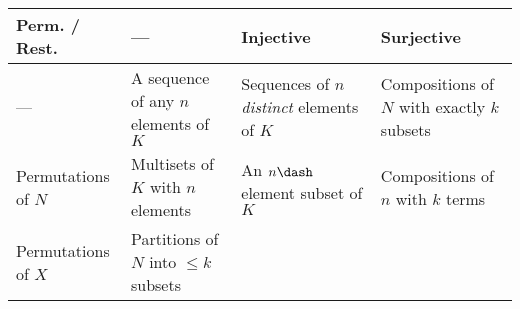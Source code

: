 \begin{longtable}[]{@{}llll@{}}
\toprule
\begin{minipage}[b]{0.18\columnwidth}\raggedright
Perm. / Rest.\strut
\end{minipage} & \begin{minipage}[b]{0.27\columnwidth}\raggedright
---\strut
\end{minipage} & \begin{minipage}[b]{0.27\columnwidth}\raggedright
Injective\strut
\end{minipage} & \begin{minipage}[b]{0.18\columnwidth}\raggedright
Surjective\strut
\end{minipage}\tabularnewline
\midrule
\endhead
\begin{minipage}[t]{0.18\columnwidth}\raggedright
---\strut
\end{minipage} & \begin{minipage}[t]{0.27\columnwidth}\raggedright
A sequence of any \(n\) elements of \(K\)\strut
\end{minipage} & \begin{minipage}[t]{0.27\columnwidth}\raggedright
Sequences of \(n\) \emph{distinct} elements of \(K\)\strut
\end{minipage} & \begin{minipage}[t]{0.18\columnwidth}\raggedright
Compositions of \(N\) with exactly \(k\) subsets\strut
\end{minipage}\tabularnewline
\begin{minipage}[t]{0.18\columnwidth}\raggedright
Permutations of \(N\)\strut
\end{minipage} & \begin{minipage}[t]{0.27\columnwidth}\raggedright
Multisets of \(K\) with \(n\) elements\strut
\end{minipage} & \begin{minipage}[t]{0.27\columnwidth}\raggedright
An \(n\dash\)element subset of \(K\)\strut
\end{minipage} & \begin{minipage}[t]{0.18\columnwidth}\raggedright
Compositions of \(n\) with \(k\) terms\strut
\end{minipage}\tabularnewline
\begin{minipage}[t]{0.18\columnwidth}\raggedright
Permutations of \(X\)\strut
\end{minipage} & \begin{minipage}[t]{0.27\columnwidth}\raggedright
Partitions of \(N\) into \(\leq k\) subsets\strut

\end{minipage}
\end{longtable}
